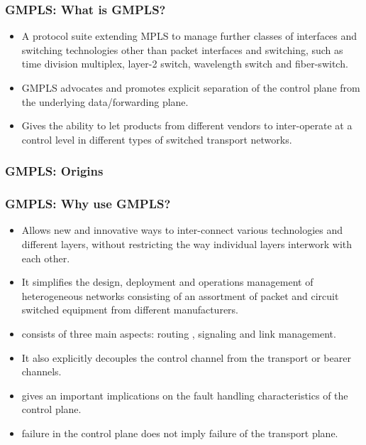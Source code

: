 \documentclass[12pt]{beamer}
\begin{document}
\begin{frame}
  \frametitle{GMPLS: What is GMPLS?}
  \begin{itemize}
    \item A protocol suite extending MPLS to manage further classes of interfaces and switching technologies other than packet interfaces and switching, such as time division multiplex, layer-2 switch, wavelength switch and fiber-switch.
    \item GMPLS advocates and promotes explicit separation of the control plane from the underlying data/forwarding plane.
    \item Gives the ability to let products from different vendors to inter-operate at a control level in different types of switched transport networks.
  \end{itemize}
\end{frame}

\begin{frame}
  \frametitle{GMPLS: Origins}
  \begin{figure}[h]
    \begin{center}
    \end{center}
  \end{figure}
\end{frame}

\begin{frame}
  \frametitle{GMPLS: Why use GMPLS?}
  \begin{itemize}                             
    \item Allows new and innovative ways to inter-connect various technologies and different layers, without restricting the way individual layers interwork with each other. 
    \item It simplifies the design, deployment and operations management of heterogeneous networks consisting of an assortment of packet and circuit switched equipment from different manufacturers.
    \item consists of three main aspects: routing , signaling and link management.
    \item It also explicitly decouples the control channel from the transport or bearer channels.
    \item gives an important implications on the fault handling characteristics of the control plane.
    \item failure in the control plane does not imply failure of the transport plane.
  \end{itemize}
\end{frame}
\end{document}
